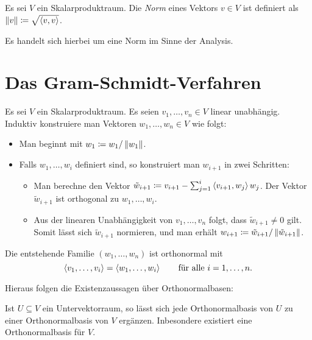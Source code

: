 
\begin{definition}
  Es sei $V$ ein Skalarproduktraum.
  Die \emph{Norm} eines Vektors $v \in V$ ist definiert als $\left\| v \right\| \coloneqq \sqrt{ \left\langle v, v \right\rangle }$.
\end{definition}

\begin{remark}
  Es handelt sich hierbei um eine Norm im Sinne der Analysis.
\end{remark}






\section{Das Gram-Schmidt-Verfahren}

Es sei $V$ ein Skalarproduktraum.
Es seien $v_1, \dotsc, v_n \in V$ linear unabhängig.
Induktiv konstruiere man Vektoren $w_1, \dotsc, w_n \in V$ wie folgt:
\begin{itemize}
  \item
    Man beginnt mit $w_1 \coloneqq w_1 / \left\| w_1 \right\|$.
  \item
    Falls $w_1, \dotsc, w_i$ definiert sind, so konstruiert man $w_{i+1}$ in zwei Schritten:
    \begin{itemize}
      \item
        Man berechne den Vektor $\tilde{w}_{i+1} \coloneqq v_{i+1} - \sum_{j=1}^i \left\langle v_{i+1}, w_j \right\rangle w_j$.
        Der Vektor $\tilde{w}_{i+1}$ ist orthogonal zu $w_1, \dotsc, w_i$.
      \item
        Aus der linearen Unabhängigkeit von $v_1, \dotsc, v_n$ folgt, dass $\tilde{w}_{i+1} \neq 0$ gilt.
        Somit lässt sich $\tilde{w}_{i+1}$ normieren, und man erhält $w_{i+1} \coloneqq \tilde{w}_{i+1} / \left\| \tilde{w}_{i+1} \right\|$.
    \end{itemize}
\end{itemize}
Die entstehende Familie $(w_1, \dotsc, w_n)$ ist orthonormal mit
\[
    \left\langle v_1, \dotsc, v_i \right\rangle
  = \left\langle w_1, \dotsc, w_i \right\rangle
  \qquad
  \text{für alle $i = 1, \dotsc, n$}.
\]

Hieraus folgen die Existenzaussagen über Orthonormalbasen:

\begin{theorem}
  Ist $U \subseteq V$ ein Untervektorraum, so lässt sich jede Orthonormalbasis von $U$ zu einer Orthonormalbasis von $V$ ergänzen.
  Inbesondere existiert eine Orthonormalbasis für $V$.
\end{theorem}

